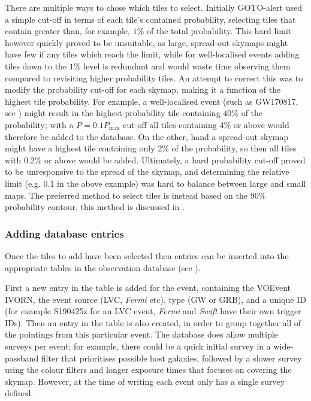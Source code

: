 \begin{colsection}
There are multiple ways to chose which tiles to select. Initially GOTO-alert used a simple cut-off in terms of each tile's contained probability, selecting tiles that contain greater than, for example, $1\%$ of the total probability. This hard limit however quickly proved to be unsuitable, as large, spread-out skymaps might have few if any tiles which reach the limit, while for well-localised events adding tiles down to the $1\%$ level is redundant and would waste time observing them compared to revisiting higher probability tiles. An attempt to correct this was to modify the probability cut-off for each skymap, making it a function of the highest tile probability. For example, a well-localised event (such as GW170817, see ) might result in the highest-probability tile containing $40\%$ of the probability; with a $P=0.1P_\text{max}$ cut-off all tiles containing 4\% or above would therefore be added to the database. On the other, hand a spread-out skymap might have a highest tile containing only 2\% of the probability, so then all tiles with 0.2\% or above would be added. Ultimately, a hard probability cut-off proved to be unresponsive to the spread of the skymap, and determining the relative limit (e.g. 0.1 in the above example) was hard to balance between large and small maps. The preferred method to select tiles is instead based on the 90\% probability contour, this method is discussed in .

\subsubsection{Adding database entries}

Once the tiles to add have been selected then entries can be inserted into the appropriate tables in the observation database (see ).

First a new entry in the  table is added for the event, containing the VOEvent IVORN, the event source (LVC, \textit{Fermi} etc), type (GW or GRB), and a unique ID (for example S190425z for an LVC event, \textit{Fermi} and \textit{Swift} have their own trigger IDs). Then an entry in the  table is also created, in order to group together all of the pointings from this particular event. The database does allow multiple surveys per event; for example, there could be a quick initial survey in a wide-passband filter that prioritises possible host galaxies, followed by a slower survey using the colour filters and longer exposure times that focuses on covering the skymap. However, at the time of writing each event only has a single survey defined.


\end{colsection}
